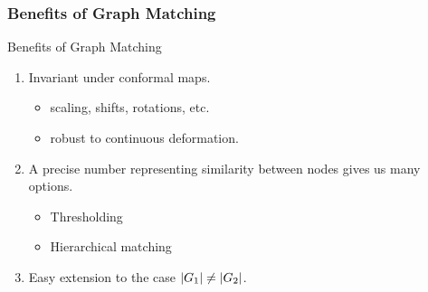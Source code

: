 \documentclass{beamer}
\begin{document}



\begin{frame}
  \frametitle{Benefits of Graph Matching}
  Benefits of Graph Matching
  \begin{enumerate}
  \item Invariant under conformal maps.
    \begin{itemize}
    \item scaling, shifts, rotations, etc.
    \item robust to continuous deformation.
    \end{itemize}
  \item A precise number representing similarity between nodes gives us many options.
    \begin{itemize}
    \item Thresholding
    \item Hierarchical matching
    \end{itemize}
  \item Easy extension to the case $\left\lvert G_1\right\rvert\neq\left\lvert G_2\right\rvert$.
  \end{enumerate}
\end{frame}
\end{document}
